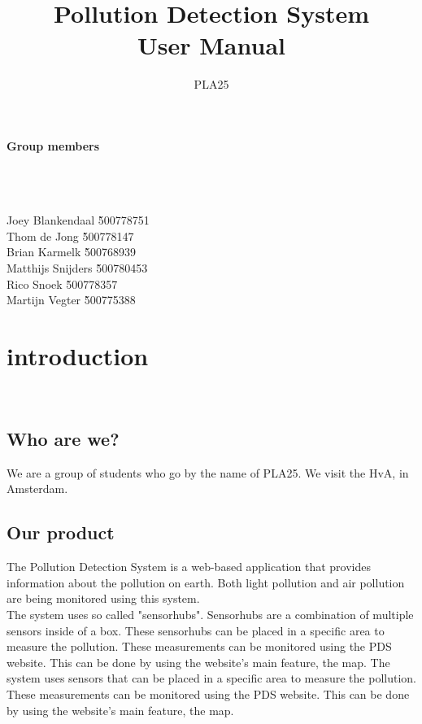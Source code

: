 \documentclass[a4paper]{article}
\title{Pollution Detection System\\User Manual}
\author{PLA25}
\begin{document}
\clearpage
\maketitle
\vspace*{\fill}

\paragraph{Group members}
~\\\\
\begin{tabbing}
Joey Blankendaal \` 500778751
\\
Thom de Jong \` 500778147
\\
Brian Karmelk \` 500768939
\\
Matthijs Snijders \` 500780453
\\
Rico Snoek \` 500778357
\\
Martijn Vegter \` 500775388
\end{tabbing}
\thispagestyle{empty}
\setcounter{page}{0}
\pagebreak
\tableofcontents
\pagebreak

\section{introduction}
~\\

\subsection{Who are we?}
We are a group of students who go by the name of PLA25. We visit the HvA, in Amsterdam.
~\\

\subsection{Our product}
The Pollution Detection System is a web-based application that provides information about the pollution on earth. Both light pollution and air pollution are being monitored using this system.
\\
The system uses so called "sensorhubs". Sensorhubs are a combination of multiple sensors inside of a box. These sensorhubs can be placed in a specific area to measure the pollution. These measurements can be monitored using the PDS website. This can be done by using the website's main feature, the map.
The system uses sensors that can be placed in a specific area to measure the pollution. These measurements can be monitored using the PDS website. This can be done by using the website's main feature, the map.
\end{document}
